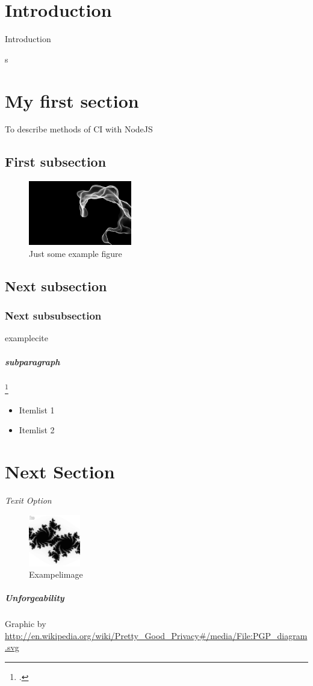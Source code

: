 \section{Introduction}
Introduction

s\newpage

\section{My first section}
\label{section:Introduction}
To describe methods of CI with NodeJS

\subsection{First subsection}

\begin{figure}[h!]
  \centering
      \includegraphics[width=0.4\textwidth]{images/Perlin-Coherent.png}
  \caption{Just some example figure}
\end{figure}

\subsection{Next subsection}

\subsubsection{Next subsubsection}
 examplecite \cite{danezis2015privacy}

\subparagraph{subparagraph}
\footcite{danezis2015privacy}

\begin{itemize}
  \item Itemlist 1
  \item Itemlist 2
\end{itemize} \cite{cranorplatform}

\section{Next Section}
\label{section:Label}

\textit{Texit Option}

\begin{figure}[h!]
  \centering
      \includegraphics[width=0.2\textwidth]{images/Julia-Fractal.png}
  \caption{Exampelimage}
\end{figure}

\subparagraph{Unforgeability}
\label{subp:subparagraph_name}

Graphic by \url{http://en.wikipedia.org/wiki/Pretty_Good_Privacy#/media/File:PGP_diagram.svg}
